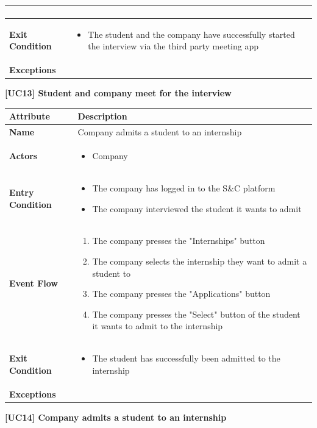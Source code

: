 \begin{center}
\begin{tabular}{|p{3cm}|p{9cm}|}
\begin{enumerate}
    \end{enumerate} \\ \hline
    \textbf{Exit Condition} & 
    \begin{itemize}
        \item The student and the company have successfully started the interview via the third party meeting app
    \end{itemize}\\ \hline
    \textbf{Exceptions} & \\ \hline
    \end{tabular}
    \newline
    \newline
    \textbf{[UC13] Student and company meet for the interview}
    \newline
    \newline


    \begin{tabular}{|p{3cm}|p{9cm}|}
    \hline
    \textbf{Attribute} & \textbf{Description} \\ \hline
    \textbf{Name} & Company admits a student to an internship \\ \hline
    \textbf{Actors} & 
    \begin{itemize}
        \item Company
    \end{itemize} \\ \hline
    \textbf{Entry Condition} & 
    \begin{itemize}
        \item The company has logged in to the S\&C platform
        \item The company interviewed the student it wants to admit
    \end{itemize}\\ \hline
    \textbf{Event Flow} & 
    \begin{enumerate}
        \item The company presses the "Internships" button
        \item The company selects the internship they want to admit a student to
        \item The company presses the "Applications" button
        \item The company presses the "Select" button of the student it wants to admit to the internship
    \end{enumerate} \\ \hline
    \textbf{Exit Condition} & 
    \begin{itemize}
        \item The student has successfully been admitted to the internship
    \end{itemize}\\ \hline
    \textbf{Exceptions} & 
    \\ \hline
    \end{tabular}
    \newline
    \newline
    \textbf{[UC14] Company admits a student to an internship}
    \newline
    \newline


\end{center}
